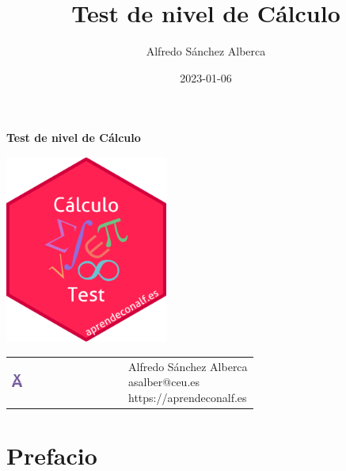 \documentclass[
  a4paper,
]{scrreport}
\title{Test de nivel de Cálculo}
\author{Alfredo Sánchez Alberca}
\date{2023-01-06}
\renewcommand*\contentsname{Tabla de contenidos}
\newcommand\contentsname{Tabla de contenidos}
\theoremstyle{definition}
\theoremstyle{remark}
\begin{document}
\begin{titlepage}

\begin{center}
\vspace*{5cm}

\Huge
{\textbf{\textsf{Test de nivel de Cálculo}}}

\vspace{0.5cm}
\LARGE
{\textbf{\textsf{}}}

\vspace{1.5cm}

\includegraphics[width=0.4\textwidth]{img/logos/sticker.png}
\end{center}

\vfill

\begin{flushleft}
\begin{tabular}{ll}
\includegraphics[width=0.1\textwidth]{img/logos/aprendeconalf.png} & \parbox[b]{5cm}{\Large\textsf{Alfredo
Sánchez
Alberca}\\ \textsf{asalber@ceu.es} \\ \textsf{https://aprendeconalf.es}}
\end{tabular}
\end{flushleft}
\end{titlepage}
\renewcommand*\contentsname{Tabla de contenidos}
{
\hypersetup{linkcolor=}
\setcounter{tocdepth}{2}
\tableofcontents
}

\chapter*{Prefacio}\label{prefacio}
\end{document}
